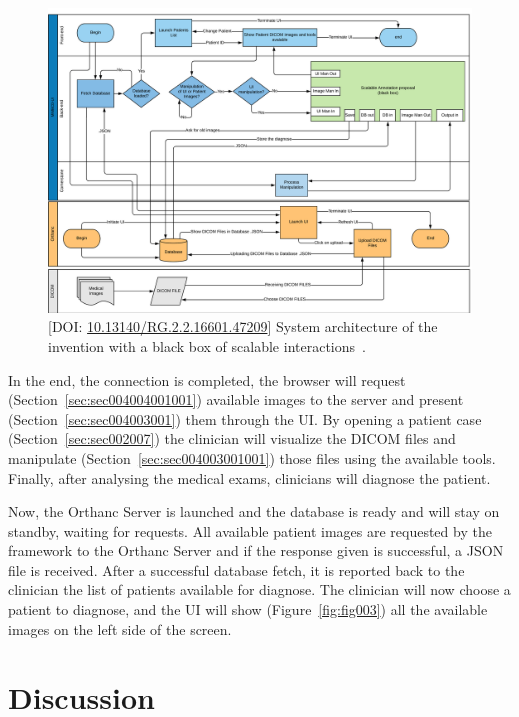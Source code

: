 \begin{figure}[ht]
\centering
\includegraphics[width=\textwidth]{images/fig012}
\caption{[DOI: \href{https://doi.org/10.13140/RG.2.2.16601.47209}{10.13140/RG.2.2.16601.47209}] System architecture of the invention with a black box of scalable interactions~\cite{hugo2020si, lencastre2020msia}.}
\label{fig:fig012}
\end{figure}

In the end, the connection is completed, the browser will request (Section~\ref{sec:sec004004001001}) available images to the server and present (Section~\ref{sec:sec004003001}) them through the \ac{UI}.
By opening a patient case (Section~\ref{sec:sec002007}) the clinician will visualize the \ac{DICOM} files and manipulate (Section~\ref{sec:sec004003001001}) those files using the available tools.
Finally, after analysing the medical exams, clinicians will diagnose the patient.

Now, the Orthanc Server is launched and the database is ready and will stay on standby, waiting for requests.
All available patient images are requested by the framework to the Orthanc Server and if the response given is successful, a \ac{JSON} file is received.
After a successful database fetch, it is reported back to the clinician the list of patients available for diagnose.
The clinician will now choose a patient to diagnose, and the \ac{UI} will show (Figure~\ref{fig:fig003}) all the available images on the left side of the screen.

\section{Discussion}
\label{sec:sec004005}

